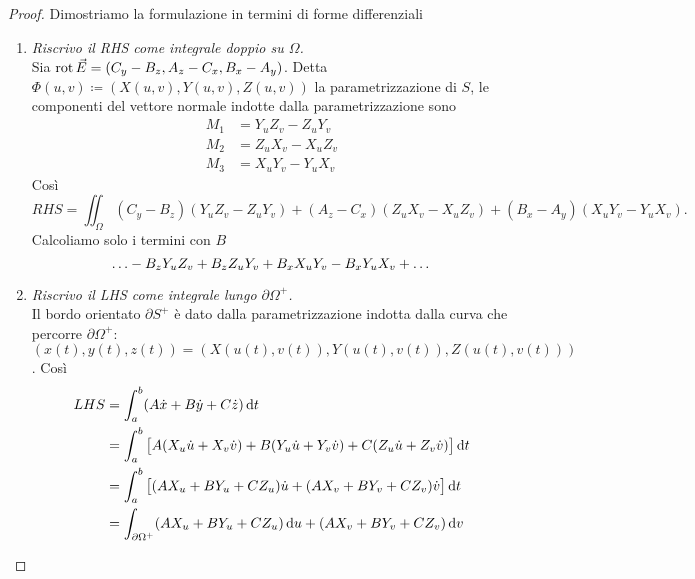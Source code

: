 \begin{proof}
	Dimostriamo la formulazione in termini di forme differenziali
	\begin{enumerate}[label = \emph{(\roman*)}]
		\item \emph{Riscrivo il RHS come integrale doppio su $ \Omega $.} \\
		Sia $ \operatorname{rot}{\vec{E}} = (C_y - B_z, A_z - C_x, B_x - A_y) $. Detta $ \Phi(u, v) \coloneqq (X(u, v), Y(u, v), Z(u, v)) $ la parametrizzazione di $ S $, le componenti del vettore normale indotte dalla parametrizzazione sono
		\begin{align*}
			M_1 & = Y_uZ_v - Z_uY_v \\
			M_2 & = Z_uX_v - X_uZ_v \\
			M_3 & = X_uY_v - Y_uX_v
		\end{align*}
		Così 
		\[
			RHS = \iint_{\Omega} (C_y - B_z)(Y_uZ_v - Z_uY_v) + (A_z - C_x)(Z_uX_v - X_uZ_v) + (B_x - A_y)(X_uY_v - Y_uX_v).
		\]
		Calcoliamo solo i termini con $ B $
		\[
			\ldots - B_zY_uZ_v + B_zZ_uY_v + B_xX_uY_v - B_xY_uX_v + \ldots \\
		\]
		
		\item \emph{Riscrivo il LHS come integrale lungo $ \partial \Omega^+ $.} \\
		Il bordo orientato $ \partial S^+ $ è dato dalla parametrizzazione indotta dalla curva che percorre $ \partial \Omega^+ $: $ (x(t), y(t), z(t)) = (X(u(t), v(t)), Y(u(t), v(t)), Z(u(t), v(t))) $. Così
		\begin{align*}
			LHS & = \int_{a}^{b}(A \dot{x} + B \dot{y} + C \dot{z}) \dif{t} \\
			& = \int_{a}^{b} \left[A (X_u \dot{u} + X_v \dot{v}) + B (Y_u \dot{u} + Y_v \dot{v}) + C (Z_u \dot{u} + Z_v \dot{v})\right] \dif{t} \\
			& = \int_{a}^{b} \left[(A X_u + B Y_u + C Z_u) \dot{u} + (A X_v + B Y_v + C Z_v) \dot{v}\right] \dif{t} \\
			& = \int_{\partial \Omega^+} (A X_u + B Y_u + C Z_u) \dif{u} + (A X_v + B Y_v + C Z_v) \dif{v} \\
		\end{align*}
		

\end{enumerate}
\end{proof}
